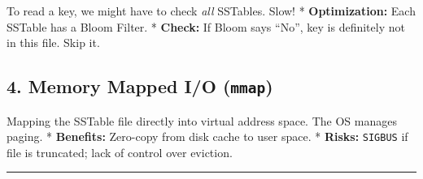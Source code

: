To read a key, we might have to check \emph{all} SSTables. Slow! *
\textbf{Optimization:} Each SSTable has a Bloom Filter. *
\textbf{Check:} If Bloom says ``No'', key is definitely not in this
file. Skip it.

\hypertarget{memory-mapped-io-mmap}{%
\subsection{\texorpdfstring{4. Memory Mapped I/O
(\texttt{mmap})}{4. Memory Mapped I/O (mmap)}}\label{memory-mapped-io-mmap}}

Mapping the SSTable file directly into virtual address space. The OS
manages paging. * \textbf{Benefits:} Zero-copy from disk cache to user
space. * \textbf{Risks:} \passthrough{\lstinline!SIGBUS!} if file is
truncated; lack of control over eviction.

\begin{center}\rule{0.5\linewidth}{0.5pt}\end{center}
